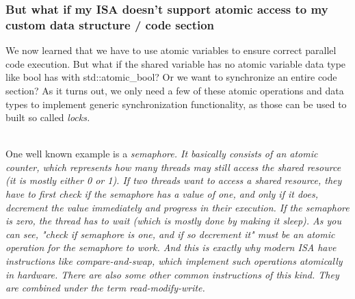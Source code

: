 \documentclass[../../main.tex]{subfiles}
\begin{document}
\bigskip
\subsubsection{But what if my ISA doesn't support atomic access to my custom data structure / code section}
We now learned that we have to use atomic variables to ensure correct parallel code execution.
But what if the shared variable has no atomic variable data type like bool has with std::atomic\_bool?
Or we want to synchronize an entire code section?
As it turns out, we only need a few of these atomic operations and data types to implement generic synchronization functionality, as those can be used to built so called \em locks\em . 

~\\
One well known example is a \em semaphore\em . It basically consists of an atomic counter, which represents how many threads may still access the shared resource (it is mostly either 0 or 1).
If two threads want to access a shared resource, they have to first check if the semaphore has a value of one, and only if it does, decrement the value immediately and progress in their execution.
If the semaphore is zero, the thread has to wait (which is mostly done by making it sleep).
As you can see, "check if semaphore is one, and if so decrement it" must be an atomic operation for the semaphore to work.
And this is exactly why modern ISA have instructions like \em compare-and-swap\em , which implement such operations atomically in hardware.
There are also some other common instructions of this kind. They are combined under the term \em read-modify-write\em .
\end{document}
